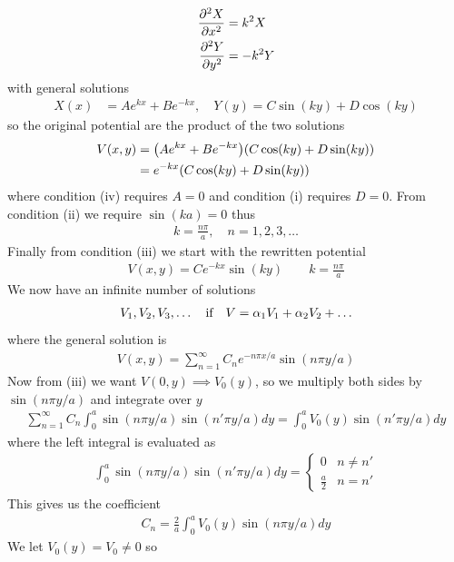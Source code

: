 \documentclass[../main.tex]{subfiles}
\begin{document}
\begin{align*}
    \pdv[2]{X}{x} &= k^2 X \\
    \pdv[2]{Y}{y} &= -k^2 Y
\end{align*}
with general solutions
\begin{align*}
    X(x) &= Ae^{kx} + Be^{-kx}, \quad Y(y) = C \sin(ky) + D \cos(ky)
\end{align*}
so the original potential are the product of the two solutions
\begin{align*}
    V(x,y) &= \qt(Ae^{kx} + Be^{-kx}) (C\cos(ky) + D\sin(ky)) \\
    &= e^{-kx} (C \cos(ky) + D \sin(ky))
\end{align*} 
where condition (iv) requires $A = 0$ and condition (i) requires $D = 0$. 
From condition (ii) we require $\sin(ka) = 0$ thus
\begin{align*}
    k = \frac{n\pi}{a},\quad n = 1,2,3,\dots
\end{align*}
Finally from condition (iii) we start with the rewritten potential
\begin{align*}
    V(x,y) = C e^{-kx} \sin(ky) \qquad k = \frac{n\pi}{a}
\end{align*}
We now have an infinite number of solutions
\begin{align*}
    V_1, V_2, V_3, \dots \qif V=\alpha_1 V_1 + \alpha_2 V_2 + \dots
\end{align*}
where the general solution is 
\begin{align*}
    V(x,y) = \sum_{n=1}^\infty C_n e^{-n\pi x/a} \sin(n\pi y/a)
\end{align*}
Now from (iii) we want $V(0,y) \implies V_0(y)$, so we multiply both sides by $\sin(n\pi y/a)$ and integrate over $y$
\begin{align*}
    \sum_{n=1}^\infty C_n \int_0^a \sin(n\pi y/a) \sin(n'\pi y/a) dy = \int_0^a V_0(y) \sin(n'\pi y/a) dy
\end{align*}
where the left integral is evaluated as
\begin{align*}
    \int_0^a \sin(n\pi y/a) \sin(n'\pi y/a) dy =
    \begin{cases}
        0 & n \neq n' \\
        \frac{a}{2} & n = n'
    \end{cases}
\end{align*}
This gives us the coefficient 
\begin{align*}
    C_n = \frac{2}{a} \int_0^a V_0(y) \sin(n\pi y/a) dy
\end{align*}
We let $V_0(y) = V_0 \neq 0$ so
\end{document}
